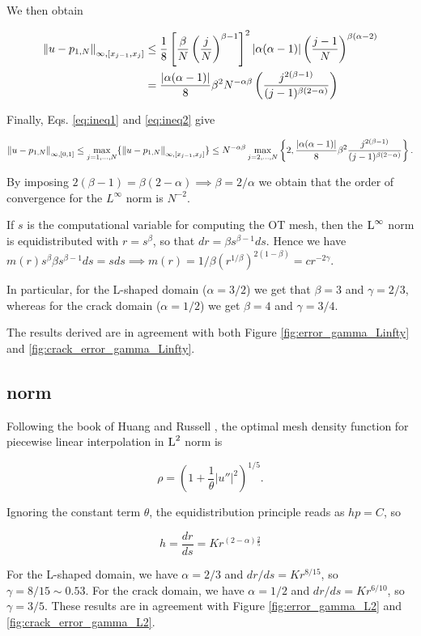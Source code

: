 \documentclass[a4paper,11pt]{article}
\begin{document}
We then obtain 

\begin{equation}
\label{eq:ineq2}
\begin{split}
  \left\|u - p_{1,N}\right\|_{\infty,[x_{j-1},x_{j}]} &\leq \frac{1}{8} \left[ \frac{\beta}{N} \left(\frac{j}{N}\right)^{\beta - 1} \right]^{2} |\alpha(\alpha - 1)| \left(\frac{j-1}{N}  \right)^{\beta(\alpha -2)}\\
  &=\frac{|\alpha(\alpha - 1)|}{8} \beta^{2} N^{-\alpha \beta} \left( \frac{j^{2(\beta - 1)}}{(j-1)^{\beta(2-\alpha)}}\right)
\end{split}
\end{equation}

Finally, Eqs. \eqref{eq:ineq1} and  \eqref{eq:ineq2} give

$$\left\|u - p_{1,N}\right\|_{\infty,[0,1]} \leq \max_{j=1,\dots,N} \{ \left\|u - p_{1,N}\right\|_{\infty,[x_{j-1},x_{j}]}\} \leq N^{-\alpha \beta} \max_{j=2,\dots,N} \left\{2, \frac{|\alpha(\alpha - 1)|}{8} \beta^{2} \frac{j^{2(\beta - 1)}}{(j-1)^{\beta(2-\alpha)}}\right\}.$$

By imposing $2(\beta - 1) = \beta(2-\alpha) \implies \beta = 2/\alpha $ we obtain that the order of convergence for the $L^{\infty}$ norm is $N^{-2}$.

If $s$ is the computational variable for computing the OT mesh, then the $\operatorname L^{\infty}$ norm is equidistributed with $r = s^{\beta}$, so that $dr = \beta s^{\beta - 1} ds$. Hence we have $m(r) s^{\beta} \beta s^{\beta-1} ds = s ds \implies m(r) = 1/\beta (r^{1/\beta})^{2(1-\beta)} = c r^{-2\gamma}$.

In particular, for the L-shaped domain ($\alpha = 3/2$) we get that $\beta = 3$ and $\gamma = 2/3$, whereas for the crack domain ($\alpha = 1/2$) we get $\beta = 4$ and $\gamma = 3/4$.

The results derived are in agreement with both Figure \ref{fig:error_gamma_Linfty} and \ref{fig:crack_error_gamma_Linfty}.  

\subsection{ norm}

Following the book of Huang and Russell \cite{HR:2011}, the optimal mesh density function for piecewise linear interpolation in $\operatorname L^{2}$ norm is

$$\rho = \left(1 + \frac{1}{\theta}|u''|^{2} \right)^{1/5}.$$

Ignoring the constant term $\theta$, the equidistribution principle reads as $hp = C$, so

$$h = \frac{dr}{ds} = K r^{(2 -\alpha)\frac{2}{5}}$$

For the L-shaped domain, we have $\alpha = 2/3$ and $dr/ds = K r^{8/15}$, so $\gamma = 8/15 \sim 0.53$. For the crack domain, we have $\alpha = 1/2$ and  $dr/ds = K r^{6/10}$, so $\gamma = 3/5$. These results are in agreement with Figure \ref{fig:error_gamma_L2} and \ref{fig:crack_error_gamma_L2}. 



\printbibliography
\end{document}
